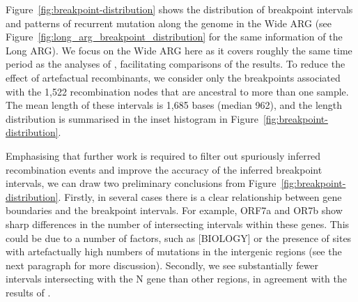 \documentclass{article}
\begin{document}
Figure~\ref{fig:breakpoint-distribution} shows the distribution of breakpoint
intervals and patterns of recurrent mutation along the genome in the Wide ARG
(see Figure~\ref{fig:long_arg_breakpoint_distribution} for the same information
of the Long ARG). We focus on the Wide ARG here as it covers roughly the same time
period as the analyses of \cite{Turakhia2022-it}, facilitating comparisons
of the results. To reduce the effect of artefactual recombinants, we
consider only the breakpoints associated with the 1,522 recombination nodes
that are ancestral to more than one sample. The mean length of these intervals
is 1,685 bases (median 962), and the length distribution is summarised in the
inset histogram in Figure~\ref{fig:breakpoint-distribution}.

Emphasising that further work is required to filter out spuriously inferred
recombination events and improve the accuracy of the inferred breakpoint
intervals, we can draw two preliminary conclusions from
Figure~\ref{fig:breakpoint-distribution}.
Firstly, in several cases there is a clear relationship between
gene boundaries and the breakpoint intervals. For example, ORF7a and OR7b
show sharp differences in the number of intersecting intervals within
these genes. This could be due to a number of factors, such as [BIOLOGY]
or the presence of sites with artefactually high numbers of mutations
in the intergenic regions (see the next paragraph for more discussion).
Secondly, we see substantially fewer intervals intersecting with the N
gene than other regions, in agreement with the results of
\cite{Turakhia2022-it}.
\end{document}
